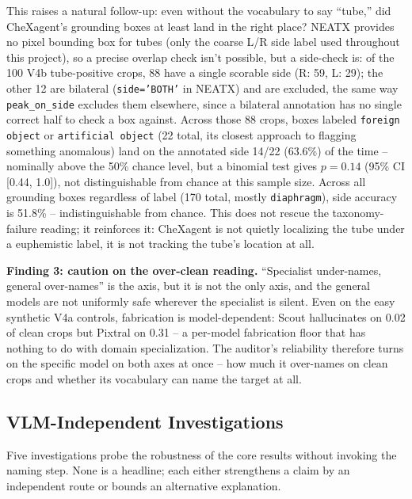 \documentclass{ieeeaccess}
\begin{document}
This raises a natural follow-up: even without the vocabulary to say ``tube,''
did CheXagent's grounding boxes at least land in the right place? NEATX
provides no pixel bounding box for tubes (only the coarse L/R side label used
throughout this project), so a precise overlap check isn't possible, but a
side-check is: of the 100 V4b tube-positive crops, 88 have a single scorable
side (R: 59, L: 29); the other 12 are bilateral (\texttt{side='BOTH'} in
NEATX) and are excluded, the same way \texttt{peak\_on\_side} excludes them
elsewhere, since a bilateral annotation has no single correct half to check
a box against. Across those 88 crops, boxes labeled \texttt{foreign object}
or \texttt{artificial object} (22 total, its closest approach to flagging
something anomalous) land on the annotated side 14/22 (63.6\%) of the time --
nominally above the 50\% chance level, but a binomial test gives $p=0.14$
(95\% CI [0.44, 1.0]), not distinguishable from chance at this sample size.
Across all grounding boxes regardless of label (170 total, mostly
\texttt{diaphragm}), side accuracy is 51.8\% -- indistinguishable from chance.
This does not rescue the taxonomy-failure reading; it reinforces it:
CheXagent is not quietly localizing the tube under a euphemistic label, it
is not tracking the tube's location at all.

\textbf{Finding 3: caution on the over-clean reading.} ``Specialist
under-names, general over-names'' is the axis, but it is not the only axis,
and the general models are not uniformly safe wherever the specialist is
silent. Even on the easy synthetic V4a controls, fabrication is
model-dependent: Scout hallucinates on 0.02 of clean crops but Pixtral on
0.31 -- a per-model fabrication floor that has nothing to do with domain
specialization. The auditor's reliability therefore turns on the specific
model on both axes at once -- how much it over-names on clean crops and
whether its vocabulary can name the target at all.

\subsection{VLM-Independent Investigations}
Five investigations probe the robustness of the core results without
invoking the naming step. None is a headline; each either strengthens a
claim by an independent route or bounds an alternative explanation.
\end{document}
